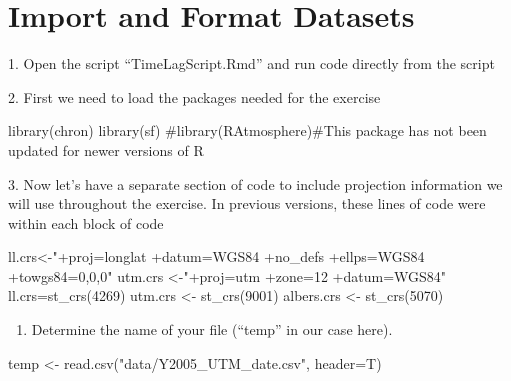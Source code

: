 \documentclass[
  letterpaper,
]{book}
\newenvironment{Shaded}{\begin{snugshade}}{\end{snugshade}}
\newcommand{\AttributeTok}[1]{\textcolor[rgb]{0.40,0.45,0.13}{#1}}
\newcommand{\CommentTok}[1]{\textcolor[rgb]{0.37,0.37,0.37}{#1}}
\newcommand{\DecValTok}[1]{\textcolor[rgb]{0.68,0.00,0.00}{#1}}
\newcommand{\FunctionTok}[1]{\textcolor[rgb]{0.28,0.35,0.67}{#1}}
\newcommand{\NormalTok}[1]{\textcolor[rgb]{0.00,0.23,0.31}{#1}}
\newcommand{\OtherTok}[1]{\textcolor[rgb]{0.00,0.23,0.31}{#1}}
\newcommand{\StringTok}[1]{\textcolor[rgb]{0.13,0.47,0.30}{#1}}
\providecommand{\tightlist}{%
  \setlength{\itemsep}{0pt}\setlength{\parskip}{0pt}}\usepackage{longtable,booktabs,array}
\begin{document}
\hypertarget{import-and-format-datasets}{%
\chapter{Import and Format Datasets}\label{import-and-format-datasets}}

1. Open the script ``TimeLagScript.Rmd'' and run code directly from the
script

2. First we need to load the packages needed for the exercise

\begin{Shaded}
\begin{Highlighting}[]
\FunctionTok{library}\NormalTok{(chron)}
\FunctionTok{library}\NormalTok{(sf)}
\CommentTok{\#library(RAtmosphere)\#This package has not been updated for newer versions of R}
\end{Highlighting}
\end{Shaded}

3. Now let's have a separate section of code to include projection
information we will use throughout the exercise. In previous versions,
these lines of code were within each block of code

\begin{Shaded}
\begin{Highlighting}[]
\NormalTok{ll.crs}\OtherTok{\textless{}{-}}\StringTok{"+proj=longlat +datum=WGS84 +no\_defs +ellps=WGS84 +towgs84=0,0,0"}
\NormalTok{utm.crs }\OtherTok{\textless{}{-}}\StringTok{"+proj=utm +zone=12 +datum=WGS84"}
\NormalTok{ll.crs}\OtherTok{=}\FunctionTok{st\_crs}\NormalTok{(}\DecValTok{4269}\NormalTok{)}
\NormalTok{utm.crs }\OtherTok{\textless{}{-}} \FunctionTok{st\_crs}\NormalTok{(}\DecValTok{9001}\NormalTok{)}
\NormalTok{albers.crs }\OtherTok{\textless{}{-}} \FunctionTok{st\_crs}\NormalTok{(}\DecValTok{5070}\NormalTok{)}
\end{Highlighting}
\end{Shaded}

\begin{enumerate}
\def\labelenumi{\arabic{enumi}.}
\setcounter{enumi}{3}
\tightlist
\item
  Determine the name of your file (``temp'' in our case here).
\end{enumerate}

\begin{Shaded}
\begin{Highlighting}[]
\NormalTok{temp }\OtherTok{\textless{}{-}} \FunctionTok{read.csv}\NormalTok{(}\StringTok{"data/Y2005\_UTM\_date.csv"}\NormalTok{, }\AttributeTok{header=}\NormalTok{T)}
\end{Highlighting}
\end{Shaded}
\end{document}
